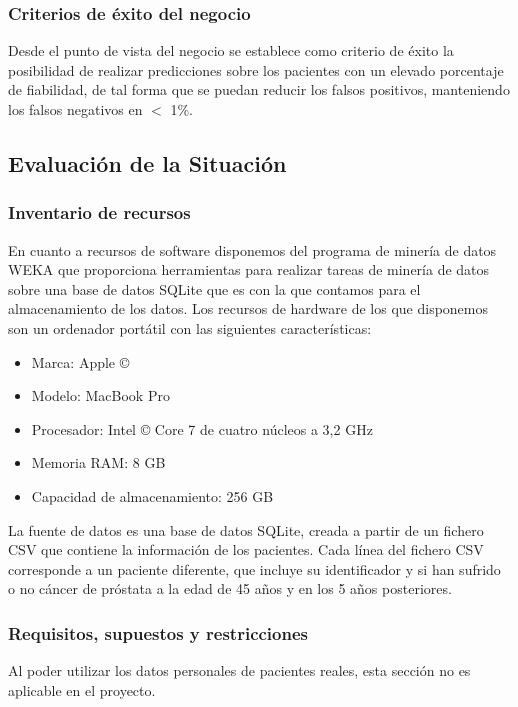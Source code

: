 \documentclass{article}
\begin{document}
\subsubsection{Criterios de éxito del negocio}
Desde el punto de vista del negocio se establece como criterio de éxito la posibilidad de realizar predicciones sobre los pacientes con un elevado porcentaje de fiabilidad, de tal forma que se puedan reducir los falsos positivos, manteniendo los falsos negativos en $<$ 1\%.

\subsection{Evaluación de la Situación}

\subsubsection{Inventario de recursos}\label{Inventario de recursos}
En cuanto a recursos de software disponemos del programa de minería de datos WEKA que proporciona herramientas para realizar tareas de minería de datos sobre una base de datos SQLite que es con la que contamos para el almacenamiento de los datos. Los recursos de hardware de los que disponemos son un ordenador portátil con las siguientes características:

\begin{itemize}
	\item Marca: Apple ©
	\item Modelo: MacBook Pro
	\item Procesador: Intel © Core 7 de cuatro núcleos a 3,2 GHz
	\item Memoria RAM: 8 GB
	\item Capacidad de almacenamiento: 256 GB
\end{itemize}

La fuente de datos es una base de datos SQLite, creada a partir de un fichero CSV que contiene la información de los pacientes. Cada línea del fichero CSV corresponde a un paciente diferente, que incluye su identificador y si han sufrido o no cáncer de próstata a la edad de 45 años y en los 5 años posteriores.

\subsubsection{Requisitos, supuestos y restricciones}
Al poder utilizar los datos personales de pacientes reales, esta sección no es aplicable en el proyecto.
\end{document}
